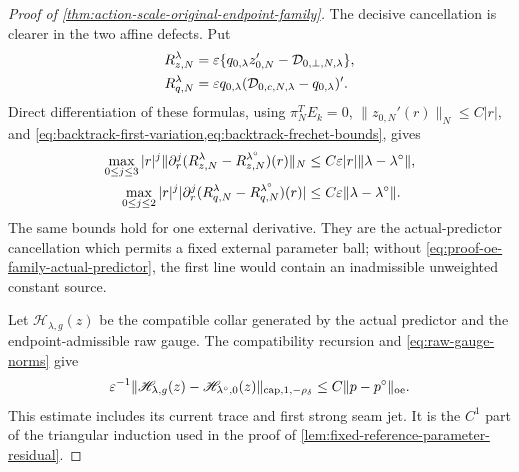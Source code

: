 \begin{proof}[Proof of
\cref{thm:action-scale-original-endpoint-family}]
The decisive cancellation is clearer in the two affine defects.  Put
\begin{align}
 R_{z,N}^{\lambda}
 &=\varepsilon\{q_{0,\lambda}z_{0,N}'
       -\mathcal D_{0,\perp,N,\lambda}\},\notag\\
 R_{q,N}^{\lambda}
 &=\varepsilon q_{0,\lambda}
       (\mathcal D_{0,c,N,\lambda}-q_{0,\lambda})'.
                                                        \label{eq:proof-oe-family-affine-defects}
\end{align}
Direct differentiation of these formulas, using
\(\pi_N^TE_k=0\), \(\|z_{0,N}'(r)\|_N\le C|r|\), and
\cref{eq:backtrack-first-variation,eq:backtrack-frechet-bounds}, gives
\begin{align}
 \max_{0\le j\le3}|r|^j
 \|\partial_r^j(R_{z,N}^{\lambda}
       -R_{z,N}^{\lambda^\circ})(r)\|_N
 &\le C\varepsilon |r|
       \|\lambda-\lambda^\circ\|,\notag\\
 \max_{0\le j\le2}|r|^j
 |\partial_r^j(R_{q,N}^{\lambda}
       -R_{q,N}^{\lambda^\circ})(r)|
 &\le C\varepsilon
       \|\lambda-\lambda^\circ\|.               \label{eq:proof-oe-family-affine-defect-ledger}
\end{align}
The same bounds hold for one external derivative.  They are the
actual-predictor cancellation which permits a fixed external parameter
ball; without \cref{eq:proof-oe-family-actual-predictor}, the first line
would contain an inadmissible unweighted constant source.

Let \(\mathscr H_{\lambda,g}(z)\) be the compatible collar generated by the actual
predictor and the endpoint-admissible raw gauge.  The compatibility
recursion and \cref{eq:raw-gauge-norms} give
\begin{equation}
 \varepsilon^{-1}
 \|\mathscr H_{\lambda,g}(z)-\mathscr H_{\lambda^\circ,0}(z)\|_
       {\mathrm{cap},1,-\rho_\delta}
 \le C\|p-p^\circ\|_{\rm oe}.                  \label{eq:proof-oe-family-collar-external-bound}
\end{equation}
This estimate includes its current trace and first strong seam jet.  It is
the \(C^1\) part of the triangular induction used in the proof of
\cref{lem:fixed-reference-parameter-residual}.


\end{proof}
